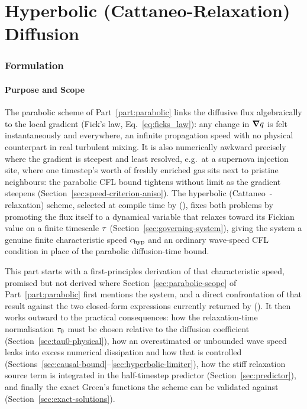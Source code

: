 
\part{Hyperbolic (Cattaneo-Relaxation) Diffusion}
\label{part:hyperbolic}

\section{Formulation}

\subsection{Purpose and Scope}
\label{sec:scope}

The parabolic scheme of Part~\ref{part:parabolic} links the diffusive
flux algebraically to the local gradient (Fick's law,
Eq.~\eqref{eq:ficks_law}): any change in $\grad q$ is felt
instantaneously and everywhere, an infinite propagation speed with no
physical counterpart in real turbulent mixing. It is also numerically
awkward precisely where the gradient is steepest and least resolved,
e.g.\ at a supernova injection site, where one timestep's worth of freshly
enriched gas sits next to pristine neighbours: the parabolic CFL bound
tightens without limit as the gradient steepens
(Section~\ref{sec:speed-criterion-aniso}). The hyperbolic
(Cattaneo~\citeyear{Cattaneo1948}-relaxation) scheme, selected at compile
time by 
(), fixes both
problems by promoting the flux itself to a dynamical variable that
relaxes toward its Fickian value on a finite timescale $\tau$
(Section~\ref{sec:governing-system}), giving the system a genuine finite
characteristic speed $c_{\rm hyp}$ and an ordinary wave-speed CFL condition in
place of the parabolic diffusion-time bound.

This part starts with a first-principles derivation of that
characteristic speed, promised but not derived where
Section~\ref{sec:parabolic-scope} of Part~\ref{part:parabolic} first
mentions the system, and a direct confrontation of that result against
the two closed-form expressions currently returned by
(). It then works outward to the
practical consequences: how the relaxation-time normalisation
$\tau_0$ must be chosen relative to the diffusion coefficient
(Section~\ref{sec:tau0-physical}), how an overestimated or unbounded wave
speed leaks into excess numerical dissipation and how that is controlled
(Sections~\ref{sec:causal-bound}--\ref{sec:hyperbolic-limiter}), how the
stiff relaxation source term is integrated in the half-timestep predictor
(Section~\ref{sec:predictor}), and finally the exact Green's functions
the scheme can be validated against (Section~\ref{sec:exact-solutions}).


